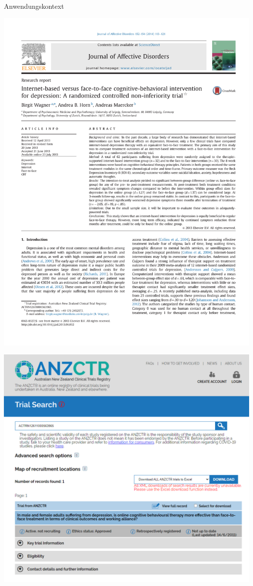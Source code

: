 \documentclass[
  8pt,
  ignorenonframetext,
]{beamer}
\begin{document}
\begin{frame}[t]{Anwendungskontext}
\protect\hypertarget{anwendungskontext-16}{}
\begin{center}\includegraphics[width=0.5\linewidth]{8_Abbildungen/alm_8_article_title} \end{center}
\vspace{2mm}

\begin{center}\includegraphics[width=0.5\linewidth]{8_Abbildungen/alm_8_article_registration} \end{center}
\end{frame}
\end{document}

